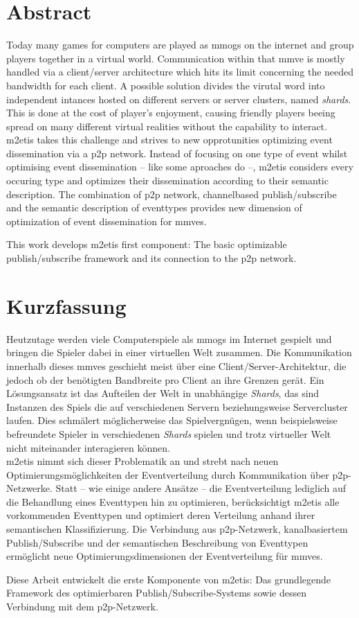\chapter*{Abstract}
Today many games for computers are played as \acfp{mmog} on the internet and group players together in a virtual world. Communication within that \acf{mmve} is mostly handled via a client/server architecture which hits its limit concerning the needed bandwidth for each client. A possible solution divides the virutal word into independent intances hosted on different servers or server clusters, named \emph{shards}. This is done at the cost of player's enjoyment, causing friendly players beeing spread on many different virtual realities without the capability to interact.\\
\acf{m2etis} takes this challenge and strives to new opprotunities optimizing event dissemination via a \acf{p2p} network. Instead of focusing on one type of event whilst optimising event dissemination -- like some aproaches do --, \ac{m2etis} considers every occuring type and optimizes their dissemination according to their semantic description. The combination of \ac{p2p} network, channelbased publish/subscribe and the semantic description of eventtypes provides new dimension of optimization of event dissemination for \acp{mmve}.

This work develops \ac{m2etis} first component: The basic optimizable publish/subscribe framework and its connection to the \ac{p2p} network.


\clearpage{\pagestyle{empty}\cleardoublepage}
\chapter*{Kurzfassung}
Heutzutage werden viele Computerspiele als \acfp{mmog} im Internet gespielt und bringen die Spieler dabei in einer virtuellen Welt zusammen. Die Kommunikation innerhalb dieses \acfp{mmve} geschieht meist über eine Client/Server-Architektur, die jedoch ob der benötigten Bandbreite pro Client an ihre Grenzen gerät. Ein Lösungsansatz ist das Aufteilen der Welt in unabhängige \emph{Shards}, das sind Instanzen des Spiels die auf verschiedenen Servern beziehungsweise Servercluster laufen. Dies schmälert möglicherweise das Spielvergnügen, wenn beispielsweise befreundete Spieler in verschiedenen \emph{Shards} spielen und trotz virtueller Welt nicht miteinander interagieren können.\\
\acf{m2etis} nimmt sich dieser Problematik an und strebt nach neuen Optimierungsmöglichkeiten der Eventverteilung durch Kommunikation über \acf{p2p}-Netzwerke. Statt -- wie einige andere Ansätze -- die Eventverteilung lediglich auf die Behandlung eines Eventtypen hin zu optimieren, berücksichtigt \ac{m2etis} alle vorkommenden Eventtypen und optimiert deren Verteilung anhand ihrer semantischen Klassifizierung. Die Verbindung aus \ac{p2p}-Netzwerk, kanalbasiertem Publish/Subscribe und der semantischen Beschreibung von Eventtypen ermöglicht neue Optimierungsdimensionen der Eventverteilung für \acp{mmve}.

Diese Arbeit entwickelt die erste Komponente von \ac{m2etis}: Das grundlegende Framework des optimierbaren Publish/Subscribe-Systems sowie dessen Verbindung mit dem \ac{p2p}-Netzwerk.

